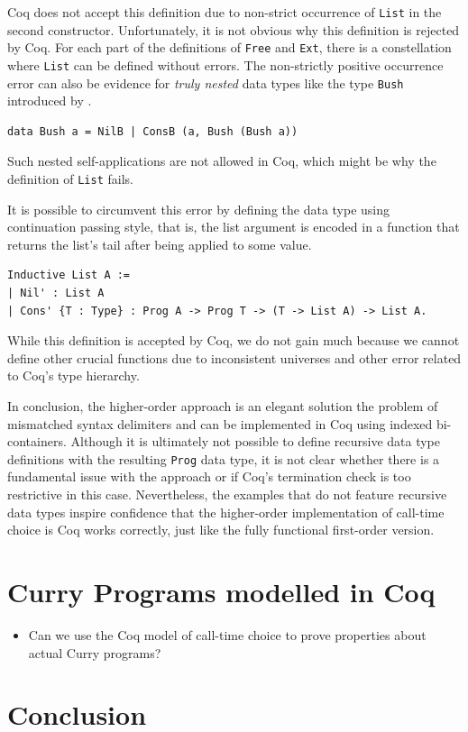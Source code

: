 \documentclass[a4paper, 11pt, fleqn, twoside]{scrreprt}
\newcommand{\hinl}[1]{\texttt{#1}}
\newcommand{\cinl}[1]{\texttt{#1}}
\begin{document}
Coq does not accept this definition due to non-strict occurrence of \cinl{List} in the second constructor.
Unfortunately, it is not obvious why this definition is rejected by Coq.
For each part of the definitions of \cinl{Free} and \cinl{Ext}, there is a constellation where \cinl{List} can be defined without errors.
The non-strictly positive occurrence error can also be evidence for \textit{truly nested} data types like the type \hinl{Bush} introduced by \citet{bird1998nested}.

\begin{verbatim}
data Bush a = NilB | ConsB (a, Bush (Bush a))
\end{verbatim}

Such nested self-applications are not allowed in Coq, which might be why the definition of \cinl{List} fails.

It is possible to circumvent this error by defining the data type using continuation passing style, that is, the list argument is encoded in a function that returns the list's tail after being applied to some value.

\begin{verbatim}
Inductive List A :=
| Nil' : List A
| Cons' {T : Type} : Prog A -> Prog T -> (T -> List A) -> List A.
\end{verbatim}

While this definition is accepted by Coq, we do not gain much because we cannot define other crucial functions due to inconsistent universes and other error related to Coq's type hierarchy.

In conclusion, the higher-order approach is an elegant solution the problem of mismatched syntax delimiters and can be implemented in Coq using indexed bi-containers.
Although it is ultimately not possible to define recursive data type definitions with the resulting \cinl{Prog} data type, it is not clear whether there is a fundamental issue with the approach or if Coq's termination check is too restrictive in this case.
Nevertheless, the examples that do not feature recursive data types inspire confidence that the higher-order implementation of call-time choice is Coq works correctly, just like the fully functional first-order version.

\chapter{Curry Programs modelled in Coq}
\begin{itemize}
\item Can we use the Coq model of call-time choice to prove properties about actual Curry programs?
\end{itemize}

\chapter{Conclusion}


\appendix
\end{document}
